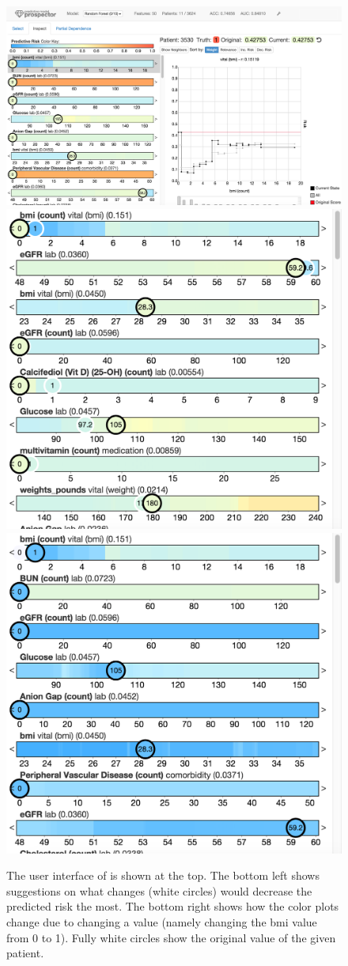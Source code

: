 \begin{figure}[t]
\centering
\includegraphics[width=0.8\linewidth]{prospector/ui_inspect} %
\\
\vspace*{0.75em} %
\includegraphics[width=0.3\linewidth]{prospector/ui_sugg} %
\hspace*{0.2\linewidth} %
\includegraphics[width=0.3\linewidth]{prospector/ui_change} %
\caption{
The user interface of \prospector is shown at the top.
The bottom left shows suggestions on what changes (white circles) would decrease the
predicted risk the most.
The bottom right shows how the color plots change due to changing a value (namely changing the
bmi value from 0 to 1).
Fully white circles show the original value of the given patient.
}
\label{figs:ui}
\end{figure}